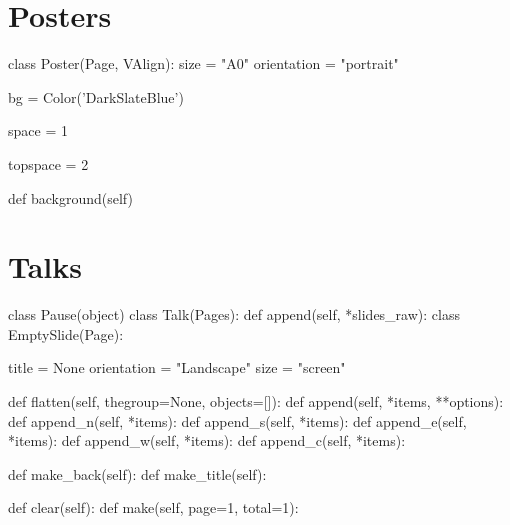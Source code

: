 \section{Posters}

\begin{python}
class Poster(Page, VAlign):
    size = "A0"
    orientation = "portrait"

    bg = Color('DarkSlateBlue')

    space = 1

    topspace = 2
	
    def background(self)
\end{python}


\section{Talks}


\begin{python}
class Pause(object)
class Talk(Pages):
    def append(self, *slides_raw):
class EmptySlide(Page):

    title = None
    orientation = "Landscape"
    size = "screen"

    def flatten(self, thegroup=None, objects=[]):
    def append(self, *items, **options):
    def append_n(self, *items):
    def append_s(self, *items):
    def append_e(self, *items):
    def append_w(self, *items):
    def append_c(self, *items):

    def make_back(self):
    def make_title(self):

	def clear(self):
    def make(self, page=1, total=1):
\end{python}

